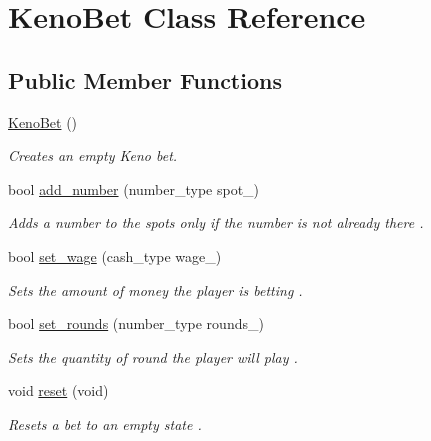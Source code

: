 \hypertarget{class_keno_bet}{}\section{Keno\+Bet Class Reference}
\label{class_keno_bet}
\subsection*{Public Member Functions}
\begin{DoxyCompactItemize}
\item 
\mbox{\label{class_keno_bet_a383bdbb38df73584f72670a1cd0f777b}} 
\mbox{\hyperlink{class_keno_bet_a383bdbb38df73584f72670a1cd0f777b}{Keno\+Bet}} ()
\begin{DoxyCompactList}\small\item\em Creates an empty Keno bet. \end{DoxyCompactList}\item 
bool \mbox{\hyperlink{class_keno_bet_a670252422c82f61d89873e2917ab19ff}{add\+\_\+number}} (number\+\_\+type spot\+\_\+)
\begin{DoxyCompactList}\small\item\em Adds a number to the spots only if the number is not already there . \end{DoxyCompactList}\item 
bool \mbox{\hyperlink{class_keno_bet_ade3e0f73094137c791c22c51bdd9ce55}{set\+\_\+wage}} (cash\+\_\+type wage\+\_\+)
\begin{DoxyCompactList}\small\item\em Sets the amount of money the player is betting . \end{DoxyCompactList}\item 
bool \mbox{\hyperlink{class_keno_bet_a513c7b942977a682d31c2242ca411fe4}{set\+\_\+rounds}} (number\+\_\+type rounds\+\_\+)
\begin{DoxyCompactList}\small\item\em Sets the quantity of round the player will play . \end{DoxyCompactList}\item 
\mbox{\label{class_keno_bet_acc2afd4d502e44fdfbb122f3389bc633}} 
void \mbox{\hyperlink{class_keno_bet_acc2afd4d502e44fdfbb122f3389bc633}{reset}} (void)
\begin{DoxyCompactList}\small\item\em Resets a bet to an empty state . \end{DoxyCompactList}\item 

\end{DoxyCompactItemize}
